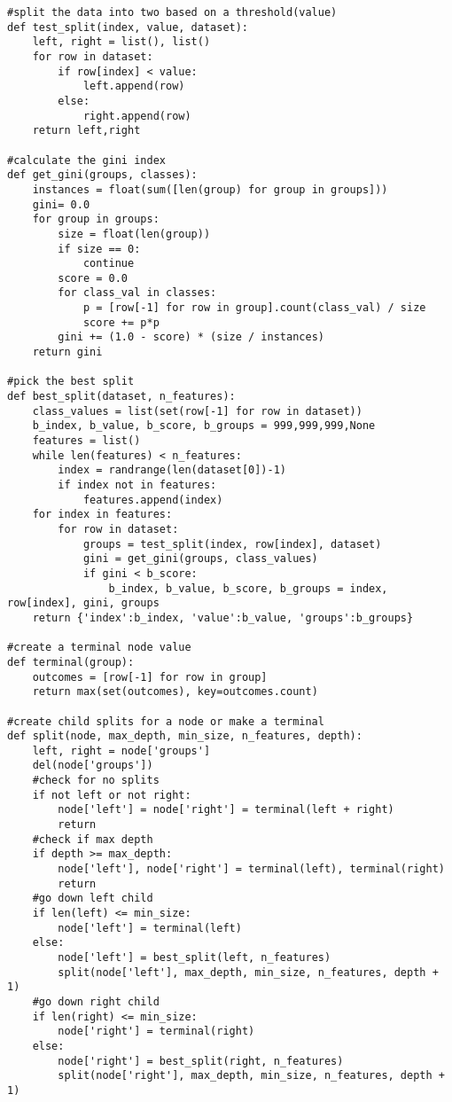 \begin{lstlisting}
#split the data into two based on a threshold(value)
def test_split(index, value, dataset):
    left, right = list(), list()
    for row in dataset:
        if row[index] < value:
            left.append(row)
        else:
            right.append(row)
    return left,right

#calculate the gini index
def get_gini(groups, classes):
    instances = float(sum([len(group) for group in groups]))
    gini= 0.0
    for group in groups:
        size = float(len(group))
        if size == 0:
            continue
        score = 0.0
        for class_val in classes:
            p = [row[-1] for row in group].count(class_val) / size
            score += p*p
        gini += (1.0 - score) * (size / instances)
    return gini

#pick the best split 
def best_split(dataset, n_features):
    class_values = list(set(row[-1] for row in dataset))
    b_index, b_value, b_score, b_groups = 999,999,999,None
    features = list()
    while len(features) < n_features:
        index = randrange(len(dataset[0])-1)
        if index not in features:
            features.append(index)
    for index in features:
        for row in dataset:
            groups = test_split(index, row[index], dataset)
            gini = get_gini(groups, class_values)
            if gini < b_score:
                b_index, b_value, b_score, b_groups = index, row[index], gini, groups
    return {'index':b_index, 'value':b_value, 'groups':b_groups}

#create a terminal node value
def terminal(group):
    outcomes = [row[-1] for row in group]
    return max(set(outcomes), key=outcomes.count)

#create child splits for a node or make a terminal
def split(node, max_depth, min_size, n_features, depth):
    left, right = node['groups']
    del(node['groups'])
    #check for no splits
    if not left or not right:
        node['left'] = node['right'] = terminal(left + right)
        return
    #check if max depth
    if depth >= max_depth:
        node['left'], node['right'] = terminal(left), terminal(right)
        return
    #go down left child
    if len(left) <= min_size:
        node['left'] = terminal(left)
    else:
        node['left'] = best_split(left, n_features)
        split(node['left'], max_depth, min_size, n_features, depth + 1)
    #go down right child
    if len(right) <= min_size:
        node['right'] = terminal(right)
    else:
        node['right'] = best_split(right, n_features)
        split(node['right'], max_depth, min_size, n_features, depth + 1)
        


\end{lstlisting}
